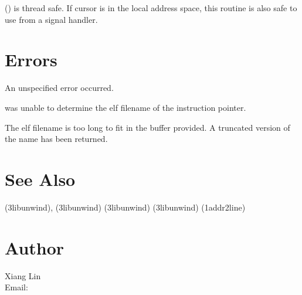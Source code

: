 \documentclass{article}
\begin{document}
() is thread safe.  If cursor  is
in the local address space, this routine is also safe to use from a
signal handler.

\section{Errors}

\begin{Description}
\item[\Const{UNW\_EUNSPEC}] An unspecified error occurred.
\item[\Const{UNW\_ENOINFO}]  was unable to determine
  the elf filename of the instruction pointer.
\item[\Const{UNW\_ENOMEM}] The elf filename is too long to fit
  in the buffer provided.  A truncated version of the name has been
  returned.
\end{Description}

\section{See Also}

(3libunwind),
(3libunwind)
(3libunwind)
(3libunwind)
(1addr2line)

\section{Author}

\noindent
Xiang Lin\\
Email: \\
\LatexManEnd
\end{document}
